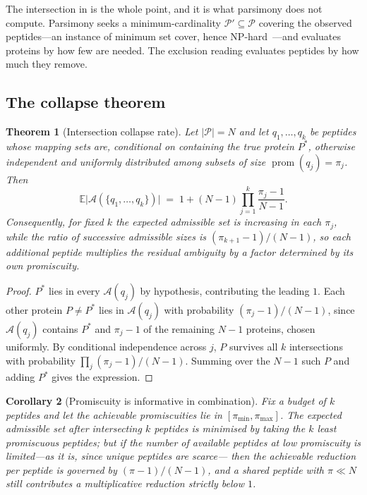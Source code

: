 \documentclass[11pt,a4paper]{article}
\newtheorem{theorem}{Theorem}[section]
\newtheorem{corollary}[theorem]{Corollary}
\theoremstyle{definition}
\theoremstyle{remark}
\newcommand{\Prot}{\mathcal{P}}              %
\newcommand{\amb}{\mathcal{A}}               %
\DeclareMathOperator{\prom}{prom}
\begin{document}
The intersection in  is the whole point, and
it is what parsimony does not compute. Parsimony seeks a minimum-cardinality
$\Prot'\subseteq\Prot$ covering the observed peptides---an instance of
minimum set cover, hence
NP-hard~\citep{karp1972reducibility,garey1979computers}---and evaluates
proteins by how few are needed. The exclusion reading evaluates peptides
by how much they remove.

\subsection{The collapse theorem}

\begin{theorem}[Intersection collapse rate]
\label{thm:collapse}
Let $|\Prot|=N$ and let $q_1,\dots,q_k$ be peptides whose mapping sets
are, conditional on containing the true protein $P^{\ast}$, otherwise
independent and uniformly distributed among subsets of size
$\prom(q_j)=\pi_j$. Then
\[
  \mathbb{E}\bigl|\amb(\{q_1,\dots,q_k\})\bigr|
  \;=\;
  1+(N-1)\prod_{j=1}^{k}\frac{\pi_j-1}{N-1}.
\]
Consequently, for fixed $k$ the expected admissible set is
\emph{increasing} in each $\pi_j$, while the \emph{ratio} of successive
admissible sizes is $(\pi_{k+1}-1)/(N-1)$, so each additional peptide
multiplies the residual ambiguity by a factor determined by its own
promiscuity.
\end{theorem}

\begin{proof}
$P^{\ast}$ lies in every $\amb(q_j)$ by hypothesis, contributing the
leading $1$. Each other protein $P\neq P^{\ast}$ lies in $\amb(q_j)$
with probability $(\pi_j-1)/(N-1)$, since $\amb(q_j)$ contains
$P^{\ast}$ and $\pi_j-1$ of the remaining $N-1$ proteins, chosen
uniformly. By conditional independence across $j$, $P$ survives all $k$
intersections with probability $\prod_j(\pi_j-1)/(N-1)$. Summing over the
$N-1$ such $P$ and adding $P^{\ast}$ gives the expression.
\end{proof}

\begin{corollary}[Promiscuity is informative in combination]
\label{cor:promiscuity}
Fix a budget of $k$ peptides and let the achievable promiscuities lie in
$[\pi_{\min},\pi_{\max}]$. The expected admissible set after intersecting
$k$ peptides is minimised by taking the $k$ \emph{least} promiscuous
peptides; but if the number of \emph{available} peptides at low
promiscuity is limited---as it is, since unique peptides are scarce---%
then the achievable reduction per peptide is governed by
$(\pi-1)/(N-1)$, and a shared peptide with $\pi\ll N$ still contributes a
multiplicative reduction strictly below $1$.
\end{corollary}
\end{document}
